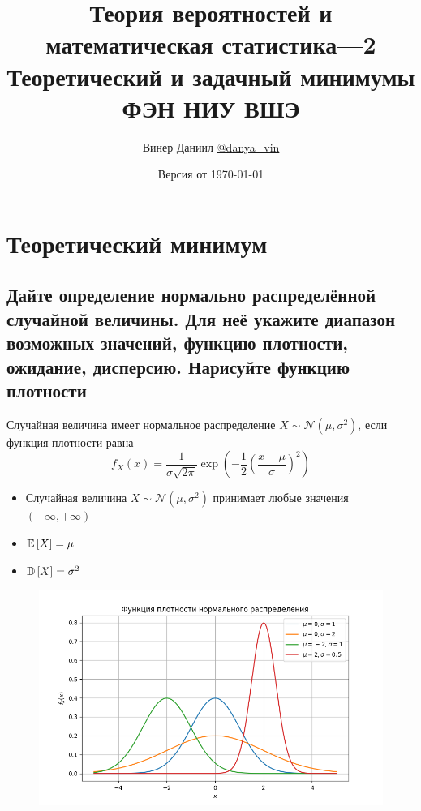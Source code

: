 \documentclass{article}
\title{\LARGE{Теория вероятностей и математическая статистика—2}\\
Теоретический и задачный минимумы\\
ФЭН НИУ ВШЭ}
\author{Винер Даниил  \href{https://t.me/danya_vin}{@danya\_vin}}
\date{Версия от \today}
\begin{document}
\maketitle
\tableofcontents
\newpage
\setlength{\parindent}{15pt}
\setlength{\parskip}{2mm}
\section{Теоретический минимум}

\subsection{Дайте определение нормально распределённой случайной величины. Для неё укажите диапазон возможных значений, функцию плотности, ожидание, дисперсию. Нарисуйте функцию плотности}
 Случайная величина имеет нормальное распределение $X\sim\mathcal{N}(\mu,\sigma^2)$, если функция плотности равна
\begin{equation*}
    f_X(x)=\frac{1}{\sigma\sqrt{2\pi}}\exp\left(-\frac{1}{2}\left(\frac{x-\mu}{\sigma}\right)^2\right)
\end{equation*}
\begin{itemize}
    \item Случайная величина $X\sim\mathcal{N}(\mu,\sigma^2)$ принимает любые значения $(-\infty,+\infty)$
    \item $\mathbb{E}\left[X\right]=\mu$
    \item $\mathbb{D}\left[X\right]=\sigma^2$
\end{itemize}
\begin{figure}[h]
    \centering
    \includegraphics[width=0.8\linewidth]{normal.png}
\end{figure}
\end{document}
